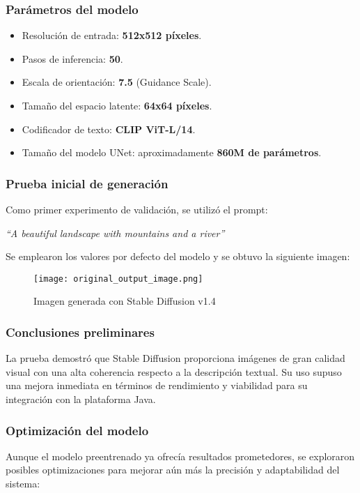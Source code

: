 \subsubsection{Parámetros del modelo}
\begin{itemize}
    \item Resolución de entrada: \textbf{512x512 píxeles}.
    \item Pasos de inferencia: \textbf{50}.
    \item Escala de orientación: \textbf{7.5} (Guidance Scale).
    \item Tamaño del espacio latente: \textbf{64x64 píxeles}.
    \item Codificador de texto: \textbf{CLIP ViT-L/14}.
    \item Tamaño del modelo UNet: aproximadamente \textbf{860M de parámetros}.
\end{itemize}

\subsubsection{Prueba inicial de generación}
Como primer experimento de validación, se utilizó el prompt:

\begin{center}
\textit{``A beautiful landscape with mountains and a river''}
\end{center}

Se emplearon los valores por defecto del modelo y se obtuvo la siguiente imagen:

\begin{figure}[H]
    \centering
    \texttt{[image: original\_output\_image.png]}
    \caption{Imagen generada con Stable Diffusion v1.4}
    \label{fig:original_image}
\end{figure}

\subsubsection{Conclusiones preliminares}
La prueba demostró que Stable Diffusion proporciona imágenes de gran calidad visual con una alta coherencia respecto a la descripción textual. Su uso supuso una mejora inmediata en términos de rendimiento y viabilidad para su integración con la plataforma Java.

\subsubsection{Optimización del modelo}
Aunque el modelo preentrenado ya ofrecía resultados prometedores, se exploraron posibles optimizaciones para mejorar aún más la precisión y adaptabilidad del sistema:


